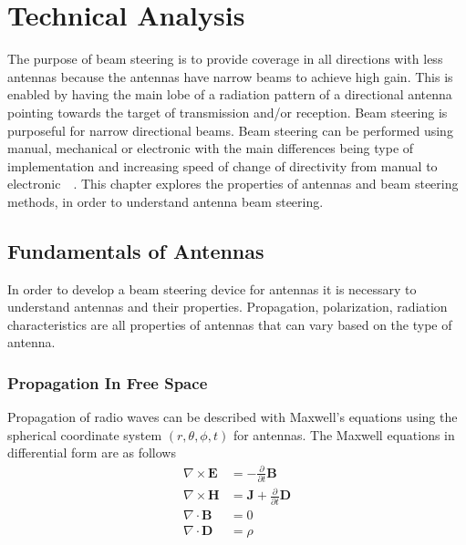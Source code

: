 \chapter{Technical Analysis}
The purpose of beam steering is to provide coverage in all directions with less antennas because the antennas have narrow beams to achieve high gain. This is enabled by having the main lobe of a radiation pattern of a directional antenna pointing towards the target of transmission and/or reception. Beam steering is purposeful for narrow directional beams. Beam steering can be performed using manual, mechanical or electronic with the main differences being type of implementation and increasing speed of change of directivity from manual to electronic~\cite{ieee_beam_steering}~\cite{ieee_microchip_beam_steering}. This chapter explores the properties of antennas and beam steering methods, in order to understand antenna beam steering.

\section{Fundamentals of Antennas}
In order to develop a beam steering device for antennas it is necessary to understand antennas and their properties. Propagation, polarization, radiation characteristics are all properties of antennas that can vary based on the type of antenna.

\subsection{Propagation In Free Space}
Propagation of radio waves can be described with Maxwell's equations using the spherical coordinate system $\left(r, \theta, \phi, t\right)$ for antennas. The Maxwell equations in differential form are as follows
\begin{equation}
    \begin{split}
        \nabla \times \textbf{E} & = - \frac{\partial }{\partial t} \textbf{B} \\
        \nabla \times \textbf{H} & = \textbf{J} + \frac{\partial }{\partial t} \textbf{D} \\
        \nabla \cdot \textbf{B} & = 0 \\
        \nabla \cdot \textbf{D} & = \rho
    \end{split}
\end{equation}

